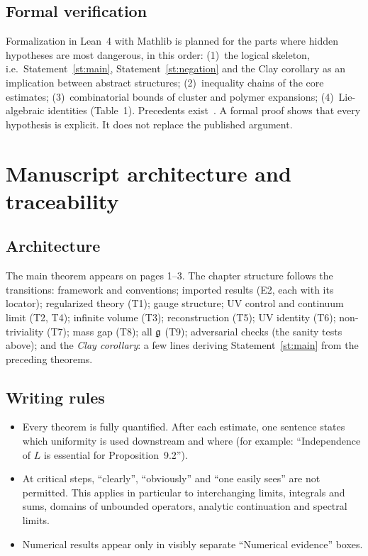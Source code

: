 \documentclass[11pt,a4paper]{article}
\begin{document}
\subsection{Formal verification}
Formalization in Lean~4 with Mathlib is planned for the parts where hidden hypotheses are most dangerous, in this order: (1)~the logical skeleton, i.e.\ Statement~\ref{st:main}, Statement~\ref{st:negation} and the Clay corollary as an implication between abstract structures; (2)~inequality chains of the core estimates; (3)~combinatorial bounds of cluster and polymer expansions; (4)~Lie-algebraic identities (Table~1). Precedents exist~\cite{DHMN26,OSR26}. A formal proof shows that every hypothesis is explicit. It does not replace the published argument.

\section{Manuscript architecture and traceability}\label{sec:manuscript}

\subsection{Architecture}
The main theorem appears on pages 1--3. The chapter structure follows the transitions: framework and conventions; imported results (E2, each with its locator); regularized theory (T1); gauge structure; UV control and continuum limit (T2, T4); infinite volume (T3); reconstruction (T5); UV identity (T6); non-triviality (T7); mass gap (T8); all $\mathfrak g$ (T9); adversarial checks (the sanity tests above); and the \emph{Clay corollary}: a few lines deriving Statement~\ref{st:main} from the preceding theorems.

\subsection{Writing rules}
\begin{itemize}
\item Every theorem is fully quantified. After each estimate, one sentence states which uniformity is used downstream and where (for example: \enquote{Independence of $L$ is essential for Proposition~9.2}).
\item At critical steps, \enquote{clearly}, \enquote{obviously} and \enquote{one easily sees} are not permitted. This applies in particular to interchanging limits, integrals and sums, domains of unbounded operators, analytic continuation and spectral limits.
\item Numerical results appear only in visibly separate \enquote{Numerical evidence} boxes.
\end{itemize}
\end{document}

